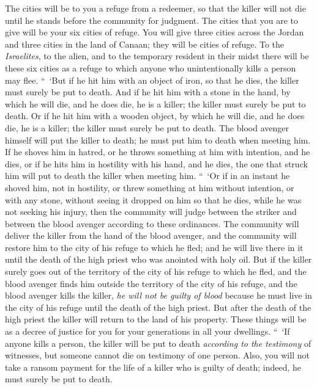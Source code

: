 \begin{biblechapter}
\verse The cities will be to you a refuge from a redeemer, so that the killer will not die until he stands before the community for judgment.
\verse The cities that you are to give will be your six cities of refuge.
\verse You will give three cities across the Jordan and three cities in the land of Canaan; they will be cities of refuge.
\verse To the \textit{Israelites}, to the alien, and to the temporary resident in their midst there will be these six cities as a refuge to which anyone who unintentionally kills a person may flee.
\verse “ ‘But if he hit him with an object of iron, so that he dies, the killer must surely be put to death.
\verse And if he hit him with a stone in the hand, by which he will die, and he does die, he is a killer; the killer must surely be put to death.
\verse Or if he hit him with a wooden object, by which he will die, and he does die, he is a killer; the killer must surely be put to death.
\verse The blood avenger himself will put the killer to death; he must put him to death when meeting him.
\verse If he shoves him in hatred, or he throws something at him with intention, and he dies,
\verse or if he hits him in hostility with his hand, and he dies, the one that struck him will put to death the killer when meeting him.
\verse “ ‘Or if in an instant he shoved him, not in hostility, or threw something at him without intention,
\verse or with any stone, without seeing it dropped on him so that he dies, while he was not seeking his injury,
\verse then the community will judge between the striker and between the blood avenger according to these ordinances.
\verse The community will deliver the killer from the hand of the blood avenger, and the community will restore him to the city of his refuge to which he fled; and he will live there in it until the death of the high priest who was anointed with holy oil.
\verse But if the killer surely goes out of the territory of the city of his refuge to which he fled,
\verse and the blood avenger finds him outside the territory of the city of his refuge, and the blood avenger kills the killer, \textit{he will not be guilty of blood}
\verse because he must live in the city of his refuge until the death of the high priest. But after the death of the high priest the killer will return to the land of his property.
\verse These things will be as a decree of justice for you for your generations in all your dwellings.
\verse “ ‘If anyone kills a person, the killer will be put to death \textit{according to the testimony} of witnesses, but someone cannot die on testimony of one person.
\verse Also, you will not take a ransom payment for the life of a killer who is guilty of death; indeed, he must surely be put to death.

\end{biblechapter}
